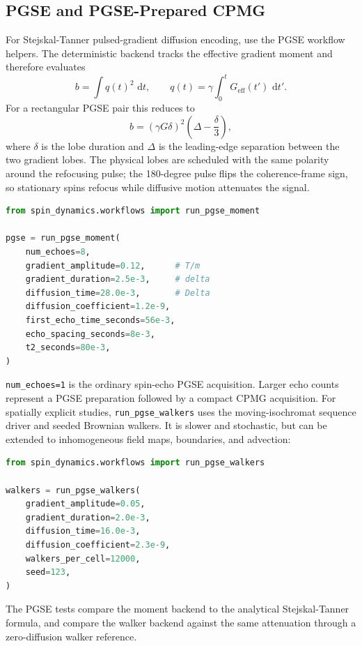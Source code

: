\documentclass[11pt,oneside]{report}
\newcommand{\code}[1]{\texttt{#1}}
\newcommand{\dd}{\,\mathrm{d}}
\begin{document}
\subsection{PGSE and PGSE-Prepared CPMG}

For Stejskal-Tanner pulsed-gradient diffusion encoding, use the PGSE workflow
helpers. The deterministic backend tracks the effective gradient moment and
therefore evaluates
\[
  b = \int q(t)^2\,\dd t,
  \qquad
  q(t)=\gamma\int_0^t G_{\mathrm{eff}}(t')\,\dd t' .
\]
For a rectangular PGSE pair this reduces to
\[
  b = (\gamma G \delta)^2\left(\Delta-\frac{\delta}{3}\right),
\]
where \(\delta\) is the lobe duration and \(\Delta\) is the leading-edge
separation between the two gradient lobes. The physical lobes are scheduled
with the same polarity around the refocusing pulse; the 180-degree pulse flips
the coherence-frame sign, so stationary spins refocus while diffusive motion
attenuates the signal.

\begin{lstlisting}[language=Python]
from spin_dynamics.workflows import run_pgse_moment

pgse = run_pgse_moment(
    num_echoes=8,
    gradient_amplitude=0.12,      # T/m
    gradient_duration=2.5e-3,     # delta
    diffusion_time=28.0e-3,       # Delta
    diffusion_coefficient=1.2e-9,
    first_echo_time_seconds=56e-3,
    echo_spacing_seconds=8e-3,
    t2_seconds=80e-3,
)
\end{lstlisting}

\code{num\_echoes=1} is the ordinary spin-echo PGSE acquisition. Larger echo
counts represent a PGSE preparation followed by a compact CPMG acquisition.
For spatially explicit studies, \code{run\_pgse\_walkers} uses the
moving-isochromat sequence driver and seeded Brownian walkers. It is slower and
stochastic, but can be extended to inhomogeneous field maps, boundaries, and
advection:

\begin{lstlisting}[language=Python]
from spin_dynamics.workflows import run_pgse_walkers

walkers = run_pgse_walkers(
    gradient_amplitude=0.05,
    gradient_duration=2.0e-3,
    diffusion_time=16.0e-3,
    diffusion_coefficient=2.3e-9,
    walkers_per_cell=12000,
    seed=123,
)
\end{lstlisting}

The PGSE tests compare the moment backend to the analytical
Stejskal-Tanner formula, and compare the walker backend against the same
attenuation through a zero-diffusion walker reference.
\end{document}
